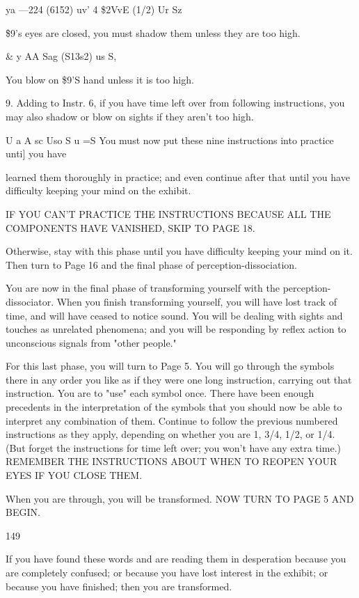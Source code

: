 \documentclass[10pt,twoside]{memoir}
\begin{document}
\begin{enumerate}
{\begin{enumerate}
\begin{sysrules}
\begin{sysrules}
\begin{sysrules}
\begin{sysrules}
{\begin{enumerate}
{{{{{{{ya —224 (6152) uv' 
4 \$2VvE (1/2) Ur Sz 


\f \$9's eyes are closed, you must shadow them unless they are too high. 


& y AA Sag (S13s2) us S, 


You blow on \$9'S hand unless it is too high. 


9. Adding to Instr. 6, if you have time left over from following 
instructions, you may also shadow or blow on sights if they aren't too high. 


U a A sc Uso S 
u =S 
You must now put these nine instructions into practice unti] you have 


learned them thoroughly in practice; and even continue after that until you 
have difficulty keeping your mind on the exhibit. 


IF YOU CAN'T PRACTICE THE INSTRUCTIONS BECAUSE ALL 
THE COMPONENTS HAVE VANISHED, SKIP TO PAGE 18. 


Otherwise, stay with this phase until you have difficulty keeping your 
mind on it. Then turn to Page 16 and the final phase of 
perception-dissociation. 


You are now in the final phase of transforming yourself with the 
perception-dissociator. When you finish transforming yourself, you will have 
lost track of time, and will have ceased to notice sound. You will be dealing 
with sights and touches as unrelated phenomena; and you will be responding 
by reflex action to unconscious signals from "other people." 

For this last phase, you will turn to Page 5. You will go through the 
symbols there in any order you like as if they were one long instruction, 
carrying out that instruction. You are to "use" each symbol once. There 
have been enough precedents in the interpretation of the symbols that you 
should now be able to interpret any combination of them. Continue to 
follow the previous numbered instructions as they apply, depending on 
whether you are 1, 3/4, 1/2, or 1/4. (But forget the instructions for time left 
over; you won't have any extra time.) REMEMBER THE INSTRUCTIONS 
ABOUT WHEN TO REOPEN YOUR EYES IF YOU CLOSE THEM. 


When you are through, you will be transformed. NOW TURN TO 
PAGE 5 AND BEGIN. 


149 


If you have found these words and are reading them in desperation 
because you are completely confused; or because you have lost interest in 
the exhibit; or because you have finished; then you are transformed. 


}}}}}}}
\end{enumerate}}
\end{sysrules}
\end{sysrules}
\end{sysrules}
\end{sysrules}
\end{enumerate}}
\end{enumerate}
\end{document}
